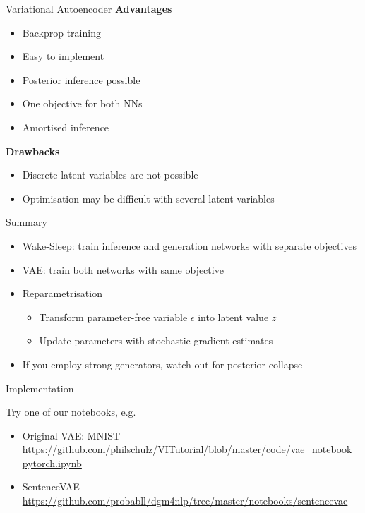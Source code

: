 \begin{frame}{Variational Autoencoder}
\textbf{Advantages}
\begin{itemize}
\item Backprop training
\item Easy to implement
\item Posterior inference possible
\item One objective for both NNs
\item Amortised inference
\end{itemize}
\pause
\textbf{Drawbacks}
\begin{itemize}
\item Discrete latent variables are not possible
\item Optimisation may be difficult with several latent variables
\end{itemize}
\end{frame}

\begin{frame}{Summary}
\begin{itemize}
\item Wake-Sleep: train inference and generation networks with separate objectives
\item VAE: train both networks with same objective
\item Reparametrisation
\begin{itemize}
\item  Transform parameter-free variable $ \epsilon $ into latent value $ z $
\item Update parameters with stochastic gradient estimates
\end{itemize}
\item If you employ strong generators, watch out for posterior collapse 
\end{itemize}
\end{frame}

\begin{frame}{Implementation}

Try one of our notebooks, e.g.
\begin{itemize}
	\item Original VAE: MNIST\\
	\url{https://github.com/philschulz/VITutorial/blob/master/code/vae_notebook_pytorch.ipynb}
	\item SentenceVAE\\
	\url{https://github.com/probabll/dgm4nlp/tree/master/notebooks/sentencevae}	
\end{itemize}
\end{frame}

